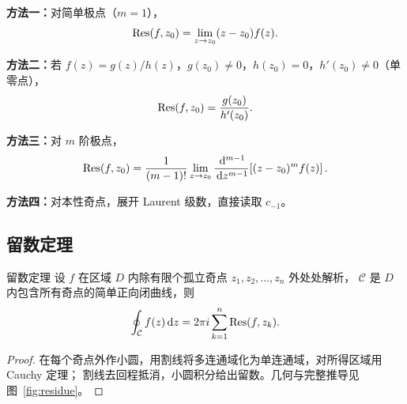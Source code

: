 \textbf{方法一：}对简单极点（$m=1$），
\begin{equation}
  \operatorname{Res}(f,z_0) = \lim_{z\to z_0}(z-z_0)f(z).
  \label{eq:res_simple}
\end{equation}

\textbf{方法二：}若 $f(z)=g(z)/h(z)$，$g(z_0)\ne0$，$h(z_0)=0$，$h'(z_0)\ne0$（单零点），
\begin{equation}
  \operatorname{Res}(f,z_0) = \frac{g(z_0)}{h'(z_0)}.
  \label{eq:res_quotient}
\end{equation}

\textbf{方法三：}对 $m$ 阶极点，
\begin{equation}
  \operatorname{Res}(f,z_0) = \frac{1}{(m-1)!}\lim_{z\to z_0}
  \frac{\,\mathrm{d}^{m-1}}{\,\mathrm{d} z^{m-1}}\!\left[(z-z_0)^m f(z)\right].
  \label{eq:res_mth}
\end{equation}

\textbf{方法四：}对本性奇点，展开 Laurent 级数，直接读取 $c_{-1}$。

\subsection{留数定理}

\begin{theorem}{留数定理}{}
\label{thm:residue}
设 $f$ 在区域 $D$ 内除有限个孤立奇点 $z_1,z_2,\ldots,z_n$ 外处处解析，
$\mathcal{C}$ 是 $D$ 内包含所有奇点的简单正向闭曲线，则
\begin{equation}
    \oint_{\mathcal{C}} f(z)\,\mathrm{d} z
    = 2\pi i\sum_{k=1}^n\operatorname{Res}(f,z_k).
  \label{eq:residue_thm}
\end{equation}
\end{theorem}

\begin{proof}
在每个奇点外作小圆，用割线将多连通域化为单连通域，对所得区域用 Cauchy 定理；
割线去回程抵消，小圆积分给出留数。几何与完整推导见图~\ref{fig:residue}。
\end{proof}

